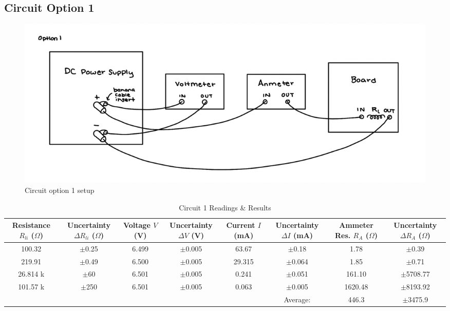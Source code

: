 \documentclass{article} %
\begin{document}
\subsection{Circuit Option 1}
\begin{figure}[htbp]            %
  \centering
  \includegraphics[width=0.9\linewidth]{Figs/Cct_1_Diagram.png}
  \caption{Circuit option 1 setup}
  \label{fig:Cct_1_Diagram}
\end{figure}

\begin{table}[htbp]
\centering
\caption{Circuit 1 Readings \& Results}
\begin{tabular}{|c|c|c|c|c|c|c|c|}
\hline
\makecell{Resistance \\ $R_{li}$ ($\Omega$)} & \makecell{Uncertainty \\ $\Delta R_{li}$ ($\Omega$)} & \makecell{Voltage \\ $V$ (V)} & \makecell{Uncertainty \\ $\Delta V$ (V)} & \makecell{Current \\ $I$ (mA)} & \makecell{Uncertainty \\ $\Delta I$ (mA)} & \makecell{Ammeter Res. \\ $R_A$ ($\Omega$)} & \makecell{Uncertainty \\ $\Delta R_A$ ($\Omega$)} \\
\hline
100.32 & $\pm$0.25 & 6.499 & $\pm$0.005 & 63.67 & $\pm$0.18 & 1.78 & $\pm$0.39 \\
\hline
219.91 & $\pm$0.49 & 6.500 & $\pm$0.005 & 29.315 & $\pm$0.064 & 1.85 & $\pm$0.71 \\
\hline
26.814 k & $\pm$60 & 6.501 & $\pm$0.005 & 0.241 & $\pm$0.051 & 161.10 & $\pm$5708.77 \\
\hline
101.57 k & $\pm$250 & 6.501 & $\pm$0.005 & 0.063 & $\pm$0.005 & 1620.48 & $\pm$8193.92 \\
\hline
\cellcolor{gray!50} & \cellcolor{gray!50} & \cellcolor{gray!50} & \cellcolor{gray!50} & \cellcolor{gray!50} & Average: & 446.3 & $\pm$3475.9 \\
\hline
\end{tabular}
\end{table}
\end{document}
